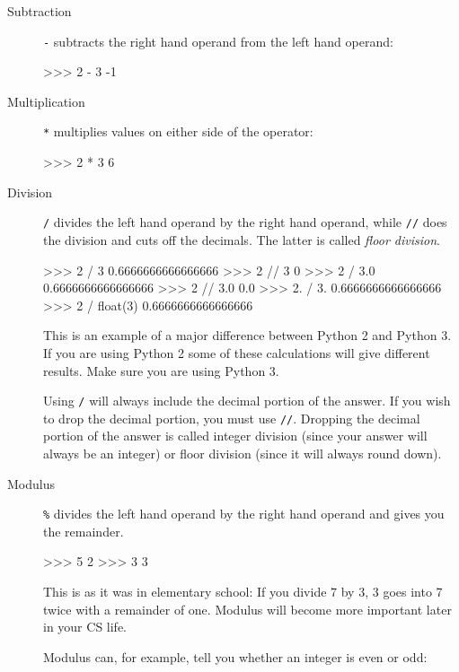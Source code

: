 \documentclass[11pt]{cselabheader}
\begin{document}
\begin{description}
  \item[Subtraction] \texttt{-} subtracts the right hand operand from the left
    hand operand:

    \begin{python3code}
>>> 2 - 3
-1
    \end{python3code}

  \item[Multiplication] \texttt{*} multiplies values on either side of the
    operator:

    \begin{python3code}
>>> 2 * 3
6
    \end{python3code}

  \item[Division] \texttt{/} divides the left hand operand by the right hand
    operand, while \texttt{//} does the division and cuts off the decimals. The
    latter is called \emph{floor division}.

  \begin{python3code}
>>> 2 / 3
0.6666666666666666
>>> 2 // 3
0
>>> 2 / 3.0
0.6666666666666666
>>> 2 // 3.0
0.0
>>> 2. / 3.
0.6666666666666666
>>> 2 / float(3)
0.6666666666666666
  \end{python3code}

    This is an example of a major difference between Python 2 and Python 3. If
    you are using Python 2 some of these calculations will give different
    results. Make sure you are using Python 3.

    Using \texttt{/} will always include the decimal portion of the answer. If
    you wish to drop the decimal portion, you must use \texttt{//}. Dropping the
    decimal portion of the answer is called integer division (since your answer
    will always be an integer) or floor division (since it will always round
    down).

  \item[Modulus] \texttt{\%} divides the left hand operand by the right hand
    operand and gives you the remainder.

    \begin{python3code}
>>> 5 %
2
>>> 3 %
3
    \end{python3code}

    This is as it was in elementary school: If you divide 7 by 3, 3 goes into 7
    twice with a remainder of one. Modulus will become more important later in
    your CS life.

    Modulus can, for example, tell you whether an integer is even or odd:


\end{description}
\end{document}

